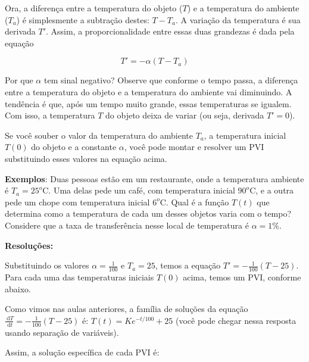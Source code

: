 \documentclass[a4paper]{article}
\newcommand{\ud}{\mathrm{\ d}}
\begin{document}
Ora, a diferença entre a temperatura do objeto ($T$) e a temperatura
do ambiente ($T_a$) é simplesmente a subtração destes: $T - T_a$. A
variação da temperatura é sua derivada $T'$. Assim, a
proporcionalidade entre essas duas grandezas é dada pela equação

\begin{displaymath}
  T' = -\alpha(T-T_a)
\end{displaymath}

Por que $\alpha$ tem sinal negativo? Observe que conforme o tempo passa, a
diferença entre a temperatura do objeto e a temperatura do ambiente
vai diminuindo. A tendência é que, após um tempo muito grande, essas
temperaturas se igualem. Com isso, a temperatura $T$ do objeto deixa
de variar (ou seja, derivada $T'=0$).

Se você souber o valor da temperatura do ambiente $T_a$, a temperatura
inicial $T(0)$ do objeto e a constante $\alpha$, você pode montar e
resolver um PVI substituindo esses valores na equação acima.

{\bf Exemplos}: Duas pessoas estão em um restaurante, onde a
temperatura ambiente é $T_a=25^o$C. Uma delas pede um café, com
temperatura inicial $90^o$C, e a outra pede um chope com temperatura
inicial $6^o$C. Qual é a função $T(t)$ que determina como a
temperatura de cada um desses objetos varia com o tempo? Considere que
a taxa de transferência nesse local de temperatura é $\alpha=1\%$.

{\bf Resoluções:}

Substituindo os valores $\alpha=\frac{1}{100}$ e $T_a=25$, temos a
equação $T'=-\frac{1}{100}(T-25)$. Para cada uma das temperaturas
iniciais $T(0)$ acima, temos um PVI, conforme abaixo.

Como vimos nas aulas anteriores, a família de soluções da equação
$\frac{\ud T}{\ud t}=-\frac{1}{100}(T-25)$ é: $T(t)=Ke^{-t/100}+25$
(você pode chegar nessa resposta usando separação de variáveis).

Assim, a solução específica de cada PVI é:
\end{document}

